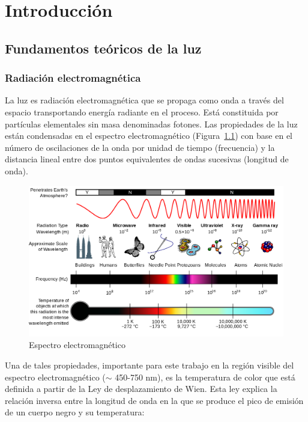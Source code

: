 \chapter{Introducción}


\section{Fundamentos teóricos de la luz}

\subsection{Radiación electromagnética}

La luz es radiación electromagnética que se propaga como onda a través del espacio transportando energía radiante en el proceso. Está constituida por partículas elementales sin masa denominadas fotones.
Las propiedades de la luz están condensadas en el espectro electromagnético (Figura~\ref{espectroelectromagnetico}) con base en el número de oscilaciones de la onda por unidad de tiempo (frecuencia) y la distancia lineal entre dos puntos equivalentes de ondas sucesivas (longitud de onda).\\

\begin{figure}
  \centering
    \includegraphics[width=1\textwidth]{espectroelectromagnetico}
  \caption{Espectro electromagnético \citep{NASA2007}}
  \label{espectroelectromagnetico}
\end{figure}

Una de tales propiedades, importante para este trabajo en la región visible del espectro electromagnético ($\sim$ 450-750 nm), es la temperatura de color que está definida a partir de la Ley de desplazamiento de Wien. Esta ley explica la relación inversa entre la longitud de onda en la que se produce el pico de emisión de un cuerpo negro y su temperatura:

